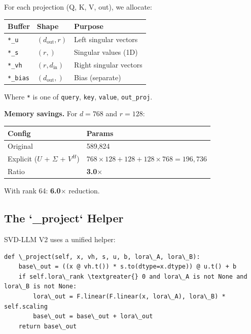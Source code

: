 For each projection (Q, K, V, out), we allocate:

\begin{table}[H]
\centering
\small
\begin{tabular}{lll}
\toprule
\textbf{Buffer} & \textbf{Shape} & \textbf{Purpose} \\
\midrule
\texttt{*\_u} & $(d_\text{out}, r)$ & Left singular vectors \\
\texttt{*\_s} & $(r,)$ & Singular values (1D) \\
\texttt{*\_vh} & $(r, d_\text{in})$ & Right singular vectors \\
\texttt{*\_bias} & $(d_\text{out},)$ & Bias (separate) \\
\bottomrule
\end{tabular}
\end{table}

Where \texttt{*} is one of \texttt{query}, \texttt{key}, \texttt{value}, \texttt{out\_proj}.

\textbf{Memory savings.} For $d = 768$ and $r = 128$:

\begin{table}[H]
\centering
\small
\begin{tabular}{ll}
\toprule
\textbf{Config} & \textbf{Params} \\
\midrule
Original & 589,824 \\
Explicit ($U$ + $\Sigma$ + $V^H$) & $768 \times 128 + 128 + 128 \times 768 = 196{,}736$ \\
Ratio & \textbf{3.0$\times$} \\
\bottomrule
\end{tabular}
\end{table}

With rank 64: \textbf{6.0$\times$} reduction.

\subsection{The `\_project` Helper}

SVD-LLM V2 uses a unified helper:

\begin{lstlisting}
def \_project(self, x, vh, s, u, b, lora\_A, lora\_B):
    base\_out = ((x @ vh.t()) * s.to(dtype=x.dtype)) @ u.t() + b
    if self.lora\_rank \textgreater{} 0 and lora\_A is not None and lora\_B is not None:
        lora\_out = F.linear(F.linear(x, lora\_A), lora\_B) * self.scaling
        base\_out = base\_out + lora\_out
    return base\_out
\end{lstlisting}

